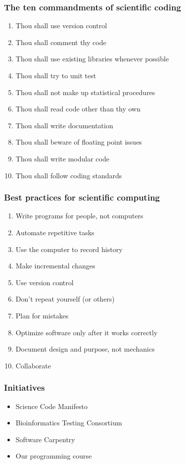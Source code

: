 \documentclass[slidestop]{beamer}
\begin{document}
\begin{frame}
  \frametitle{The ten commandments of scientific coding}
  \begin{enumerate}
    \item Thou shall use version control
    \item Thou shall comment thy code
    \item Thou shall use existing libraries whenever possible
    \item Thou shall try to unit test
    \item Thou shall not make up statistical procedures
    \item Thou shall read code other than thy own
    \item Thou shall write documentation
    \item Thou shall beware of floating point issues
    \item Thou shall write modular code
    \item Thou shall follow coding standards
  \end{enumerate}
\end{frame}

\begin{frame}
  \frametitle{Best practices for scientific computing}
  \begin{enumerate}
    \item Write programs for people, not computers
    \item Automate repetitive tasks
    \item Use the computer to record history
    \item Make incremental changes
    \item Use version control
    \item Don't repeat yourself (or others)
    \item Plan for mistakes
    \item Optimize software only after it works correctly
    \item Document design and purpose, not mechanics
    \item Collaborate
  \end{enumerate}
\end{frame}

\begin{frame}
  \frametitle{Initiatives}
  \begin{itemize}
    \item Science Code Manifesto
    \item Bioinformatics Testing Consortium
    \item Software Carpentry
    \item Our programming course
  \end{itemize}
\end{frame}
\end{document}
